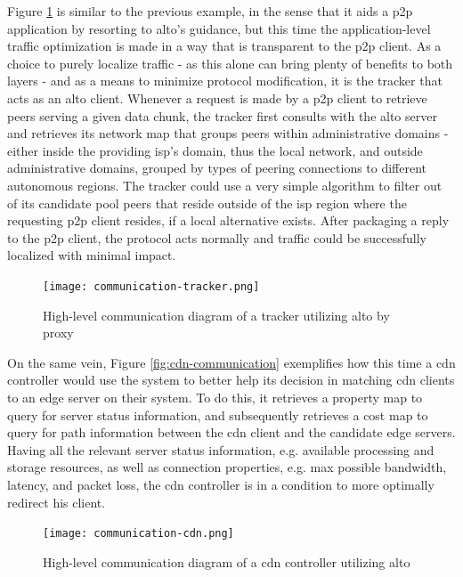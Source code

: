     Figure \ref{fig:communication-tracker} is similar to the previous example, in the sense that it aids a \gls{p2p} application by resorting to \gls{alto}'s guidance, but this time the application-level traffic optimization is made in a way that is transparent to the \gls{p2p} client.
    As a choice to purely localize traffic - as this alone can bring plenty of benefits to both layers - and as a means to minimize protocol modification, it is the tracker that acts as an \gls{alto} client.
    Whenever a request is made by a \gls{p2p} client to retrieve peers serving a given data chunk, the tracker first consults with the \gls{alto} server and retrieves its network map that groups peers within administrative domains - either inside the providing \gls{isp}'s domain, thus the local network, and outside administrative domains, grouped by types of peering connections to different autonomous regions.
    The tracker could use a very simple algorithm to filter out of its candidate pool peers that reside outside of the \gls{isp} region where the requesting \gls{p2p} client resides, if a local alternative exists.
    After packaging a reply to the \gls{p2p} client, the protocol acts normally and traffic could be successfully localized with minimal impact.

\begin{figure}[H]
        \centering
        \hspace*{-1em}
        \texttt{[image: communication-tracker.png]}
        \caption{High-level communication diagram of a tracker utilizing \gls{alto} by proxy}
        \label{fig:communication-tracker}
\end{figure}

    On the same vein, Figure \ref{fig:cdn-communication} exemplifies how this time a \gls{cdn} controller would use the system to better help its decision in matching \gls{cdn} clients to an edge server on their system.
    To do this, it retrieves a property map to query for server status information, and subsequently retrieves a cost map to query for path information between the \gls{cdn} client and the candidate edge servers.
    Having all the relevant server status information, e.g. available processing and storage resources, as well as connection properties, e.g. max possible bandwidth, latency, and packet loss, the \gls{cdn} controller is in a condition to more optimally redirect his client.

\begin{figure}[H]
        \centering
        \hspace*{-2em}
        \texttt{[image: communication-cdn.png]}
        \caption{High-level communication diagram of a \gls{cdn} controller utilizing \gls{alto}}
        \label{fig:communication-cdn}
\end{figure}

